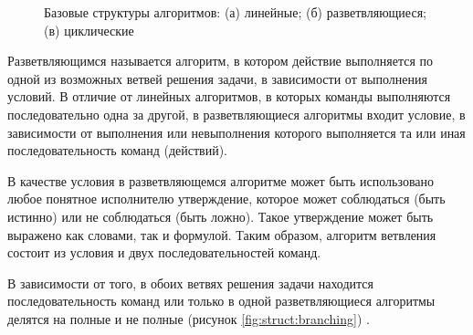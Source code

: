 \begin{figure}[!ht]
    \qquad
    \qquad
    \caption{Базовые структуры алгоритмов: (а) линейные; (б) разветвляющиеся; (в) циклические}
    \label{fig:struct}
\end{figure}

Разветвляющимся называется алгоритм, в котором действие выполняется по одной из возможных ветвей решения задачи, в зависимости от выполнения условий. В отличие от линейных алгоритмов, в которых команды выполняются последовательно одна за другой, в разветвляющиеся алгоритмы входит условие, в зависимости от выполнения или невыполнения которого выполняется та или иная последовательность команд (действий).

В качестве условия в разветвляющемся алгоритме может быть использовано любое понятное исполнителю утверждение, которое может соблюдаться (быть истинно) или не соблюдаться (быть ложно). Такое утверждение может быть выражено как словами, так и формулой. Таким образом, алгоритм ветвления состоит из условия и двух последовательностей команд.

В зависимости от того, в обоих ветвях решения задачи находится последовательность команд или только в одной разветвляющиеся алгоритмы делятся на полные и не полные (рисунок \ref{fig:struct:branching}) \cite{szci:struct}.


